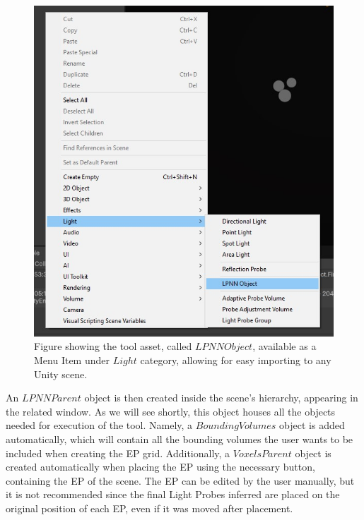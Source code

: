 \begin{figure}[h]
	\centering
	\includegraphics[scale=0.6]{Graphics/UI_lpnn.jpg}
	\caption{Figure showing the tool asset, called $LPNN Object$, available as a Menu Item under $Light$ category, allowing for easy importing to any Unity scene.}
	\label{fig:UI_add}
\end{figure}

An $LPNN Parent$ object is then created inside the scene's hierarchy, appearing in the related window. As we will see shortly, this object houses all the objects needed for execution of the tool. Namely, a $BoundingVolumes$ object is added automatically, which will contain all the bounding volumes the user wants to be included when creating the EP grid. Additionally, a $VoxelsParent$ object is created automatically when placing the EP using the necessary button, containing the EP of the scene. The EP can be edited by the user manually, but it is not recommended since the final Light Probes inferred are placed on the original position of each EP, even if it was moved after placement.

